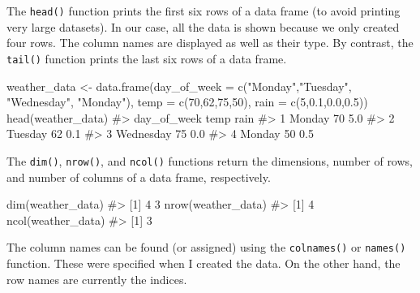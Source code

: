 \documentclass[
  letterpaper,
]{krantz}
\makeatletter
\newenvironment{Shaded}{\begin{snugshade}}{\end{snugshade}}
\newcommand{\AttributeTok}[1]{\textcolor[rgb]{0.40,0.45,0.13}{#1}}
\newcommand{\CommentTok}[1]{\textcolor[rgb]{0.37,0.37,0.37}{#1}}
\newcommand{\DecValTok}[1]{\textcolor[rgb]{0.68,0.00,0.00}{#1}}
\newcommand{\FloatTok}[1]{\textcolor[rgb]{0.68,0.00,0.00}{#1}}
\newcommand{\FunctionTok}[1]{\textcolor[rgb]{0.28,0.35,0.67}{#1}}
\newcommand{\NormalTok}[1]{\textcolor[rgb]{0.00,0.23,0.31}{#1}}
\newcommand{\OtherTok}[1]{\textcolor[rgb]{0.00,0.23,0.31}{#1}}
\newcommand{\StringTok}[1]{\textcolor[rgb]{0.13,0.47,0.30}{#1}}
\newenvironment{kframe}{%
\medskip{}
\setlength{\fboxsep}{.8em}
 \def\at@end@of@kframe{}%
 \ifinner\ifhmode%
  \def\at@end@of@kframe{\end{minipage}}%
  \begin{minipage}{\columnwidth}%
 \fi\fi%
 \def\FrameCommand##1{\hskip\@totalleftmargin \hskip-\fboxsep
 \colorbox{shadecolor}{##1}\hskip-\fboxsep
     \hskip-\linewidth \hskip-\@totalleftmargin \hskip\columnwidth}%
 \MakeFramed {\advance\hsize-\width
   \@totalleftmargin\z@ \linewidth\hsize
   \@setminipage}}%
 {\par\unskip\endMakeFramed%
 \at@end@of@kframe}
\renewenvironment{Shaded}{\begin{kframe}}{\end{kframe}}
\makeatother
\begin{document}
The \texttt{head()} function prints the first six rows of a data frame
(to avoid printing very large datasets). In our case, all the data is
shown because we only created four rows. The column names are displayed
as well as their type. By contrast, the \texttt{tail()} function prints
the last six rows of a data frame.

\begin{Shaded}
\begin{Highlighting}[]
\NormalTok{weather\_data }\OtherTok{\textless{}{-}} \FunctionTok{data.frame}\NormalTok{(}\AttributeTok{day\_of\_week =} \FunctionTok{c}\NormalTok{(}\StringTok{"Monday"}\NormalTok{,}\StringTok{"Tuesday"}\NormalTok{,}
                                           \StringTok{"Wednesday"}\NormalTok{, }\StringTok{"Monday"}\NormalTok{), }
                           \AttributeTok{temp =} \FunctionTok{c}\NormalTok{(}\DecValTok{70}\NormalTok{,}\DecValTok{62}\NormalTok{,}\DecValTok{75}\NormalTok{,}\DecValTok{50}\NormalTok{), }
                           \AttributeTok{rain =} \FunctionTok{c}\NormalTok{(}\DecValTok{5}\NormalTok{,}\FloatTok{0.1}\NormalTok{,}\FloatTok{0.0}\NormalTok{,}\FloatTok{0.5}\NormalTok{))}
\FunctionTok{head}\NormalTok{(weather\_data)}
\CommentTok{\#\textgreater{}   day\_of\_week temp rain}
\CommentTok{\#\textgreater{} 1      Monday   70  5.0}
\CommentTok{\#\textgreater{} 2     Tuesday   62  0.1}
\CommentTok{\#\textgreater{} 3   Wednesday   75  0.0}
\CommentTok{\#\textgreater{} 4      Monday   50  0.5}
\end{Highlighting}
\end{Shaded}

The \texttt{dim()}, \texttt{nrow()}, and \texttt{ncol()} functions
return the dimensions, number of rows, and number of columns of a data
frame, respectively.

\begin{Shaded}
\begin{Highlighting}[]
\FunctionTok{dim}\NormalTok{(weather\_data)}
\CommentTok{\#\textgreater{} [1] 4 3}
\FunctionTok{nrow}\NormalTok{(weather\_data)}
\CommentTok{\#\textgreater{} [1] 4}
\FunctionTok{ncol}\NormalTok{(weather\_data)}
\CommentTok{\#\textgreater{} [1] 3}
\end{Highlighting}
\end{Shaded}

The column names can be found (or assigned) using the
\texttt{colnames()} or \texttt{names()} function. These were specified
when I created the data. On the other hand, the row names are currently
the indices.
\end{document}
